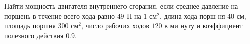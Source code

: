 Найти мощность двигателя внутреннего сгорания, если среднее давление на
поршень в течение всего хода равно $49$ Н на $1$ см$^2$, длина хода порш
ня $40$ см, площадь поршня $300$ см$^2$, число рабочих ходов $120$ в ми
нуту и коэффициент полезного действия $0.9$.
